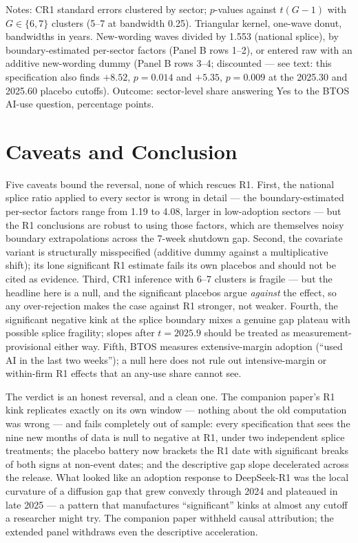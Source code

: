 \documentclass[11pt]{article}
\begin{document}
\begin{table}[t]
\medskip
\parbox{0.92\textwidth}{\footnotesize Notes: CR1 standard errors clustered by
sector; $p$-values against $t(G-1)$ with $G \in \{6,7\}$ clusters (5--7 at
bandwidth 0.25). Triangular kernel, one-wave donut, bandwidths in years.
New-wording waves divided by 1.553 (national splice), by boundary-estimated
per-sector factors (Panel B rows 1--2), or entered raw with an additive
new-wording dummy (Panel B rows 3--4; discounted --- see text: this
specification also finds $+8.52$, $p=0.014$ and $+5.35$, $p=0.009$ at the
2025.30 and 2025.60 placebo cutoffs). Outcome: sector-level share answering
Yes to the BTOS AI-use question, percentage points.}
\end{table}

\section{Caveats and Conclusion}\label{sec:conclusion}

Five caveats bound the reversal, none of which rescues R1. First, the
national splice ratio applied to every sector is wrong in detail --- the
boundary-estimated per-sector factors range from 1.19 to 4.08, larger in
low-adoption sectors --- but the R1 conclusions are robust to using those
factors, which are themselves noisy boundary extrapolations across the 7-week
shutdown gap. Second, the covariate variant is structurally misspecified
(additive dummy against a multiplicative shift); its lone significant R1
estimate fails its own placebos and should not be cited as evidence. Third,
CR1 inference with 6--7 clusters is fragile \cite{cameron2015} --- but the
headline here is a null, and the significant placebos argue \emph{against}
the effect, so any over-rejection makes the case against R1 stronger, not
weaker. Fourth, the significant negative kink at the splice boundary mixes a
genuine gap plateau with possible splice fragility; slopes after $t=2025.9$
should be treated as measurement-provisional either way. Fifth, BTOS measures
extensive-margin adoption (``used AI in the last two weeks''); a null here
does not rule out intensive-margin or within-firm R1 effects that an
any-use share cannot see.

The verdict is an honest reversal, and a clean one. The companion paper's R1
kink replicates exactly on its own window --- nothing about the old
computation was wrong --- and fails completely out of sample: every
specification that sees the nine new months of data is null to negative at
R1, under two independent splice treatments; the placebo battery now brackets
the R1 date with significant breaks of both signs at non-event dates; and the
descriptive gap slope decelerated across the release. What looked like an
adoption response to DeepSeek-R1 was the local curvature of a diffusion gap
that grew convexly through 2024 and plateaued in late 2025 --- a pattern that
manufactures ``significant'' kinks at almost any cutoff a researcher might
try. The companion paper withheld causal attribution; the extended panel
withdraws even the descriptive acceleration.
\end{document}
